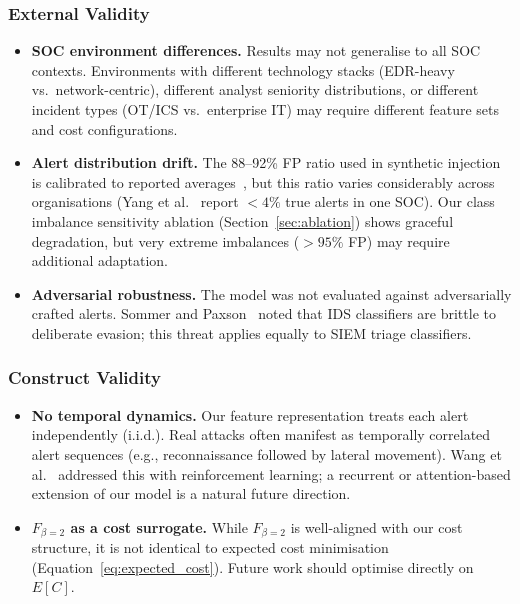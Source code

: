 \documentclass[conference]{IEEEtran}
\begin{document}
\subsubsection{External Validity}
\begin{itemize}
  \item \textbf{SOC environment differences.}
    Results may not generalise to all SOC contexts.
    Environments with different technology stacks (EDR-heavy vs.\ network-centric),
    different analyst seniority distributions, or different incident types (OT/ICS vs.\
    enterprise IT) may require different feature sets and cost configurations.
  \item \textbf{Alert distribution drift.}
    The 88--92\% FP ratio used in synthetic injection is calibrated to reported averages~\cite{alahmadi2020},
    but this ratio varies considerably across organisations (Yang et al.~\cite{yang2024}
    report $<4\%$ true alerts in one SOC).
    Our class imbalance sensitivity ablation (Section~\ref{sec:ablation}) shows graceful
    degradation, but very extreme imbalances ($>95\%$ FP) may require additional adaptation.
  \item \textbf{Adversarial robustness.}
    The model was not evaluated against adversarially crafted alerts.
    Sommer and Paxson~\cite{sommer2010} noted that IDS classifiers are brittle to
    deliberate evasion; this threat applies equally to SIEM triage classifiers.
\end{itemize}

\subsubsection{Construct Validity}
\begin{itemize}
  \item \textbf{No temporal dynamics.}
    Our feature representation treats each alert independently (i.i.d.).
    Real attacks often manifest as temporally correlated alert sequences (e.g., reconnaissance
    followed by lateral movement).
    Wang et al.~\cite{wang2024} addressed this with reinforcement learning; a recurrent or
    attention-based extension of our model is a natural future direction.
  \item \textbf{$F_{\beta=2}$ as a cost surrogate.}
    While $F_{\beta=2}$ is well-aligned with our cost structure, it is not identical to
    expected cost minimisation (Equation~\ref{eq:expected_cost}).
    Future work should optimise directly on $E[C]$.
\end{itemize}
\end{document}
